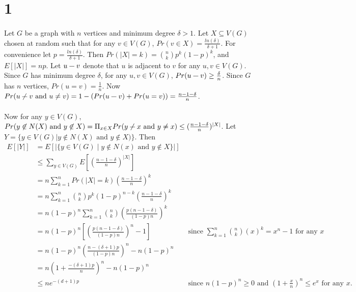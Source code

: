 \documentclass[letterpaper,12pt,oneside,onecolumn]{report}
\newcommand{\adjacent}[1][.7em]{\mathrel{\rule[.5ex]{#1}{.4pt}}}
\newcommand{\notadjacent}[1][.7em]{\mathrel{\centernot{\adjacent[#1]}}}
\begin{document}
\section*{1}
\paragraph{}
Let $G$ be a graph with $n$ vertices and minimum degree $\delta > 1$. Let $X \subseteq V(G)$ chosen at random such that for any $v \in V(G)$, $Pr(v \in X) = \frac{ln(\delta)}{\delta + 1}$. For convenience let $p = \frac{ln(\delta)}{\delta + 1}$. Then $Pr(|X| = k ) = {n \choose k} p^k (1-p)^k$, and $E[|X|] = np$. Let $u  \adjacent v$ denote that $u$ is adjacent to $v$ for any $u,v \in V(G)$. Since $G$ has minimum degree $\delta$, for any $u, v \in V(G)$, $Pr(u \adjacent v) \geq \frac{\delta}{n}$. Since $G$ has $n$ vertices, $Pr(u = v) = \frac{1}{n}$. Now $Pr(u \notadjacent v \text{ and } u \neq v) = 1 - (Pr(u \adjacent v) + Pr(u = v)) = \frac{n - 1- \delta}{n}$.
\paragraph{}
Now for any $y \in V(G)$, $Pr(y \not \in N(X) \text{ and } y \not\in X) = \Pi_{x \in X} Pr(y \notadjacent x \text{ and } y \neq x) \leq (\frac{n - 1- \delta}{n})^{|X|}$. Let $Y = \{y \in V(G) | y \not \in N(X) \text{ and } y \not\in X)\}$. Then
\begin{align*}
E[|Y|] &= E[|\{y \in V(G)\mid y \not\in N(x) \text{ and } y \not\in X\}|] \\
&\leq \sum_{y \in V(G)} E[(\frac{n - 1- \delta}{n})^{|X|}] \\
&= n \sum_{k = 1}^n Pr(|X| = k) (\frac{n - 1- \delta}{n})^{k} \\
&= n \sum_{k=1}^n {n \choose k} p^k (1-p)^{n-k} (\frac{n - 1- \delta}{n})^{k} \\
&= n(1-p)^n \sum_{k=1}^n {n \choose k} (\frac{p(n - 1- \delta)}{(1-p)n})^{k} \\
&=  n(1-p)^n [(\frac{p(n - 1- \delta)}{(1-p)n})^{n} - 1] &\text{ since $\sum_{k=1}^n {n \choose k} (x)^{k} = x^n - 1$ for any $x$}\\
&= n(1-p)^n (\frac{n - (\delta + 1)p}{(1-p)n})^n - n(1-p)^n \\
&= n(1 + \frac{-(\delta+1)p}{n})^n - n(1-p)^n \\
&\leq ne^{-(d+1)p} &\text{ since $n(1-p)^n \geq 0$ and $(1 + \frac{x}{n})^n \leq e^x$ for any $x$.}
\end{align*}
\end{document}
